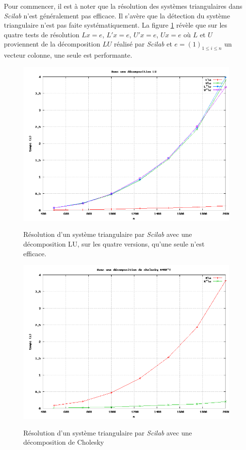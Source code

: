 \label{chap2:decomp}
Pour commencer, il est \`a noter que la r\'esolution 
des syst\`emes triangulaires dans {\it Scilab} n'est g\'en\'eralement pas efficace. Il s'av\`ere que la d\'etection du syst\`eme triangulaire 
n'est pas faite syst\'ematiquement. La figure \ref{fig:lu} r\'ev\`ele que sur les quatre tests de r\'esolution
 $Lx=e$, $L'x=e$, $U'x=e$, $Ux=e$ o\`u $L$ et $U$ proviennent de la d\'ecomposition $LU$ r\'ealis\'e par {\it Scilab} et
 $e=(1)_{1\leq i\leq n}$ un vecteur colonne, une seule est performante.

\begin{figure}
\caption{R\'esolution d'un syst\`eme triangulaire par {\it Scilab} avec une d\'ecomposition LU, sur les quatre versions,
qu'une seule n'est efficace.}
\center
\includegraphics[scale=0.39]{figures/LU.png}
\label{fig:lu}
\end{figure}


\begin{figure}
\caption{R\'esolution d'un syst\`eme triangulaire par {\it Scilab} avec une d\'ecomposition de Cholesky}
\center
\includegraphics[scale=0.39]{figures/chol.png}
\label{fig:chol}
\end{figure}

